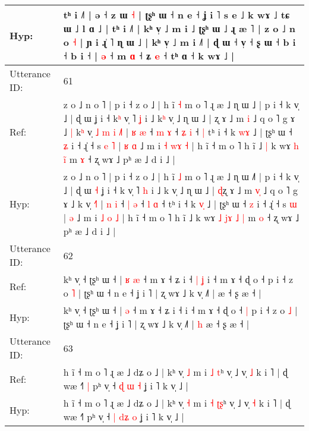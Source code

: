 \documentclass[10pt]{article}
\DeclareRobustCommand{\hl}[1]{{\textcolor{red}{#1}}}
\begin{document}
\begin{longtable}{ll}
 \\
Hyp: & tʰ i ˩˥ | ə ˧ z ɯ \hl{˧} | ʈʂʰ ɯ ˧ n e ˧ ʝ i ˥ s e ˩ k wɤ ˩ tɕ ɯ ˩ l ɑ ˩ | tʰ i ˩˥ | kʰ v̩ ˩ m i ˩ ʈʂʰ ɯ ˩ ɻ æ ˥ | z o ˩ n o \hl{˧} | ɲ i\hl{}\hl{} ɻ̍ ˥ ɳ ɯ ˩ | kʰ v̩ ˩ m i ˩˥ | ɖ ɯ ˧ v̩ ˧\hl{}\hl{} ʂ ɯ ˧ b i ˧ b i ˧ |\hl{}\hl{} \hl{ə} ˧ m \hl{ɑ} ˧ ʑ \hl{e} ˧\hl{}\hl{} tʰ ɑ ˧ k wɤ ˩ |
 \\
\midrule
Utterance ID: & 61 \\
Ref: & z o ˩ n o ˥ | p i ˧ z o ˩ | h ĩ \hl{˧} m o ˥ ɻ æ ˩ ɳ ɯ ˩\hl{} | p i ˧ k v̩ ˩ | ɖ ɯ\hl{}\hl{} ʝ i ˧ k\hl{ʰ} v̩ ˥ \hl{ʝ} i ˩ k\hl{ʰ} v̩ ˩ ɳ ɯ ˩ | \hl{}ʐ ɤ ˩ m \hl{}\hl{i} ˩ q o ˥ g ɤ ˩\hl{ }\hl{|} k\hl{ʰ} v̩\hl{ }\hl{˩}\hl{ }\hl{m}\hl{ }\hl{i} \hl{˩}˥ | \hl{ʁ} \hl{æ} ˧ \hl{m} \hl{ɤ} ˧ \hl{ʑ} \hl{i} ˧\hl{ }\hl{|} tʰ i ˧ k \hl{w}\hl{ɤ} ˩ | ʈʂʰ ɯ ˧ \hl{ʑ} i ˧ ɻ̍ ˧ s\hl{ }\hl{e} \hl{˥} |\hl{ }\hl{ʁ} \hl{ɑ} ˩ m i \hl{˧} \hl{w}\hl{ɤ} \hl{˧} | h ĩ ˧ m o ˥ h ĩ ˩\hl{ }\hl{|} k wɤ\hl{}\hl{} \hl{}\hl{h} \hl{}\hl{i}\hl{̃} m \hl{ɤ} ˧ ʐ wɤ ˩ pʰ æ ˩ d i ˩ |
 \\
Hyp: & z o ˩ n o ˥ | p i ˧ z o ˩ | h ĩ \hl{˩} m o ˥ ɻ æ ˩ ɳ ɯ ˩\hl{˥} | p i ˧ k v̩ ˩ | ɖ ɯ\hl{ }\hl{˧} ʝ i ˧ k\hl{} v̩ ˥ \hl{h} i ˩ k\hl{} v̩ ˩ ɳ ɯ ˩ | \hl{ɖ}ʐ ɤ ˩ m \hl{v}\hl{̩} ˩ q o ˥ g ɤ ˩\hl{}\hl{} k\hl{} v̩\hl{}\hl{}\hl{}\hl{}\hl{}\hl{} \hl{˧}˥ | \hl{n} \hl{i} ˧ \hl{|} \hl{ə} ˧ \hl{l} \hl{ɑ} ˧\hl{}\hl{} tʰ i ˧ k \hl{v}\hl{̩} ˩ | ʈʂʰ ɯ ˧ \hl{z} i ˧ ɻ̍ ˧ s\hl{}\hl{} \hl{ɯ} |\hl{}\hl{} \hl{ə} ˩ m i \hl{˩} \hl{}\hl{o} \hl{˩} | h ĩ ˧ m o ˥ h ĩ ˩\hl{}\hl{} k wɤ\hl{ }\hl{˩} \hl{j}\hl{ɤ} \hl{˩}\hl{ }\hl{|} m \hl{o} ˧ ʐ wɤ ˩ pʰ æ ˩ d i ˩ |
 \\
\midrule
Utterance ID: & 62 \\
Ref: & kʰ v̩ ˧ ʈʂʰ ɯ ˧ |\hl{ }\hl{ʁ} \hl{æ} ˧ m ɤ ˧ ʑ i ˧\hl{ }\hl{|}\hl{ }\hl{ʝ} i ˧ m ɤ ˧ ɖ o ˧\hl{}\hl{} p i ˧ z o \hl{˥} | ʈʂʰ ɯ ˧ n e ˧ ʝ i ˥ | ʐ wɤ ˩ k v̩ ˩˥ |\hl{}\hl{} æ ˧ ʂ æ ˧ |
 \\
Hyp: & kʰ v̩ ˧ ʈʂʰ ɯ ˧ |\hl{}\hl{} \hl{ə} ˧ m ɤ ˧ ʑ i ˧\hl{}\hl{}\hl{}\hl{} i ˧ m ɤ ˧ ɖ o ˧\hl{ }\hl{|} p i ˧ z o \hl{˩} | ʈʂʰ ɯ ˧ n e ˧ ʝ i ˥ | ʐ wɤ ˩ k v̩ ˩˥ |\hl{ }\hl{h} æ ˧ ʂ æ ˧ |
 \\
\midrule
Utterance ID: & 63 \\
Ref: & h ĩ ˧ m o ˥ ɻ æ ˩ dʑ o ˩ | kʰ v̩ \hl{˩} m i \hl{˩} \hl{}\hl{t}ʰ v̩ ˩ v̩ \hl{˩} k i ˥ | ɖ wæ ˧˥\hl{ }\hl{|} pʰ v̩ ˧ \hl{ɖ} \hl{}\hl{ɯ} \hl{˧} ʝ i ˥ k v̩ ˩ |
 \\
Hyp: & h ĩ ˧ m o ˥ ɻ æ ˩ dʑ o ˩ | kʰ v̩ \hl{˧} m i \hl{˧} \hl{ʈ}\hl{ʂ}ʰ v̩ ˩ v̩ \hl{˧} k i ˥ | ɖ wæ ˧˥\hl{}\hl{} pʰ v̩ ˧ \hl{|} \hl{d}\hl{ʑ} \hl{o} ʝ i ˥ k v̩ ˩ |

\end{longtable}
\end{document}
